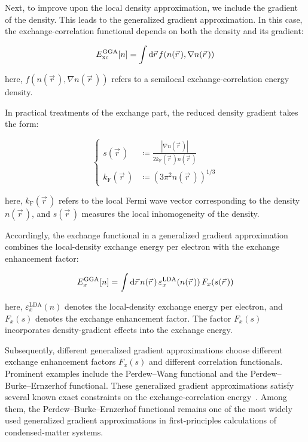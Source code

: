 Next, to improve upon the local density approximation,
we include the gradient of the density.
This leads to the generalized gradient approximation.
In this case, the exchange-correlation functional depends on both the density and its gradient:

\begin{equation}
    E_\mathrm{xc}^\mathrm{GGA}[n]
    = \int\mathrm{d}{\vec{r}}\,f(n(\vec{r}\,),\nabla n(\vec{r}\,))
\label{GGA_exchange_correlation_functional}
\end{equation}

here, $f(n(\vec{r}\,),\nabla n(\vec{r}\,))$ refers to a semilocal exchange-correlation energy density.

In practical treatments of the exchange part,
the reduced density gradient takes the form:

\begin{equation}
\left\{\begin{aligned}
    s(\vec{r}\,)&\coloneqq\frac{|\nabla n(\vec{r}\,)|}{2k_\mathrm{F}(\vec{r}\,)n(\vec{r}\,)}   \\
    k_\mathrm{F}(\vec{r}\,)&\coloneqq\left(3\pi^2 n(\vec{r}\,)\right)^{1/3}
\end{aligned}\right.
\label{reduced_density_gradient_definition}
\end{equation}

here, $k_\mathrm{F}(\vec{r}\,)$ refers to the local Fermi wave vector corresponding to the density $n(\vec{r}\,)$,
and $s(\vec{r}\,)$ measures the local inhomogeneity of the density.

Accordingly, the exchange functional in a generalized gradient approximation combines the local-density exchange energy per electron with the exchange enhancement factor:

\begin{equation}
    E_x^\mathrm{GGA}[n]
    = \int\mathrm{d}{\vec{r}}\,n(\vec{r}\,)\,\varepsilon_x^\mathrm{LDA}(n(\vec{r}\,))\,F_x(s(\vec{r}\,))
\label{GGA_exchange_functional_enhancement_factor_form}
\end{equation}

here, $\varepsilon_x^\mathrm{LDA}(n)$ denotes the local-density exchange energy per electron,
and $F_x(s)$ denotes the exchange enhancement factor.
The factor $F_x(s)$ incorporates density-gradient effects into the exchange energy.

Subsequently, different generalized gradient approximations choose different exchange enhancement factors $F_x(s)$ and different correlation functionals.
Prominent examples include the Perdew--Wang functional and the Perdew--Burke--Ernzerhof functional.
These generalized gradient approximations satisfy several known exact constraints on the exchange-correlation energy~\cite{perdew1992atoms, perdew1996generalized}.
Among them, the Perdew--Burke--Ernzerhof functional remains one of the most widely used generalized gradient approximations in first-principles calculations of condensed-matter systems.

